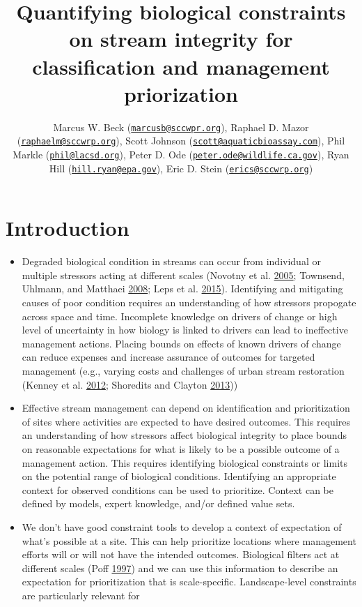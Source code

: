\documentclass[]{article}
\title{Quantifying biological constraints on stream integrity for
classification and management priorization}
\author{Marcus W. Beck
(\href{mailto:marcusb@sccwpr.org}{\nolinkurl{marcusb@sccwpr.org}}),
Raphael D. Mazor
(\href{mailto:raphaelm@sccwrp.org}{\nolinkurl{raphaelm@sccwrp.org}}),
Scott Johnson
(\href{mailto:scott@aquaticbioassay.com}{\nolinkurl{scott@aquaticbioassay.com}}),
Phil Markle (\href{mailto:phil@lacsd.org}{\nolinkurl{phil@lacsd.org}}),
Peter D. Ode
(\href{mailto:peter.ode@wildlife.ca.gov}{\nolinkurl{peter.ode@wildlife.ca.gov}}),
Ryan Hill
(\href{mailto:hill.ryan@epa.gov}{\nolinkurl{hill.ryan@epa.gov}}), Eric
D. Stein (\href{mailto:erics@sccwrp.org}{\nolinkurl{erics@sccwrp.org}})}
\date{}
\begin{document}
\maketitle

\section{Introduction}\label{introduction}

\begin{itemize}
\item
  Degraded biological condition in streams can occur from individual or
  multiple stressors acting at different scales (Novotny et al.
  \protect\hyperlink{ref-Novotny05}{2005}; Townsend, Uhlmann, and
  Matthaei \protect\hyperlink{ref-Townsend08}{2008}; Leps et al.
  \protect\hyperlink{ref-Leps15}{2015}). Identifying and mitigating
  causes of poor condition requires an understanding of how stressors
  propogate across space and time. Incomplete knowledge on drivers of
  change or high level of uncertainty in how biology is linked to
  drivers can lead to ineffective management actions. Placing bounds on
  effects of known drivers of change can reduce expenses and increase
  assurance of outcomes for targeted management (e.g., varying costs and
  challenges of urban stream restoration (Kenney et al.
  \protect\hyperlink{ref-Kenney12}{2012}; Shoredits and Clayton
  \protect\hyperlink{ref-Shoredits13}{2013}))
\item
  Effective stream management can depend on identification and
  prioritization of sites where activities are expected to have desired
  outcomes. This requires an understanding of how stressors affect
  biological integrity to place bounds on reasonable expectations for
  what is likely to be a possible outcome of a management action. This
  requires identifying biological constraints or limits on the potential
  range of biological conditions. Identifying an appropriate context for
  observed conditions can be used to prioritize. Context can be defined
  by models, expert knowledge, and/or defined value sets.
\item
  We don't have good constraint tools to develop a context of
  expectation of what's possible at a site. This can help prioritize
  locations where management efforts will or will not have the intended
  outcomes. Biological filters act at different scales (Poff
  \protect\hyperlink{ref-Poff97}{1997}) and we can use this information
  to describe an expectation for prioritization that is scale-specific.
  Landscape-level constraints are particularly relevant for

\end{itemize}
\end{document}
